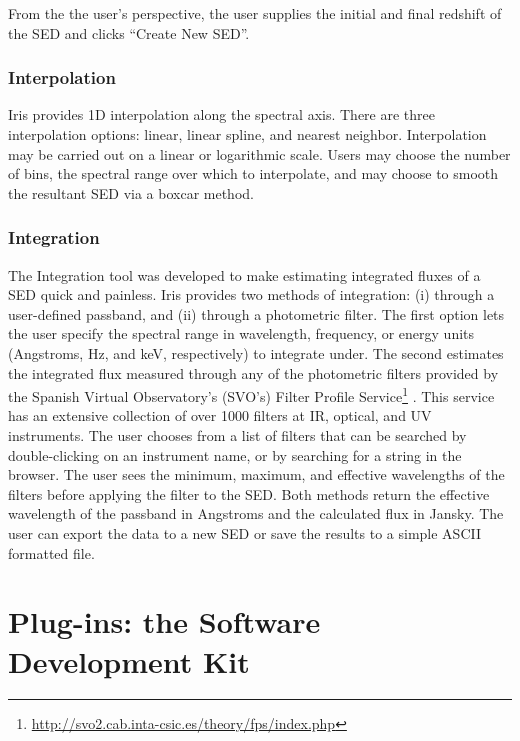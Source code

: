 \documentclass[preprint,authoryear,5p]{elsarticle}
\begin{document}
From the the user's perspective, the user supplies the initial and final redshift of the
SED and clicks ``Create New SED''.

\subsubsection{Interpolation} Iris provides 1D interpolation along the spectral
axis. There are three interpolation options: linear, linear spline, and nearest
neighbor. Interpolation may be carried out on a linear or logarithmic scale.
Users may choose the number of bins, the spectral range over which to
interpolate, and may choose to smooth the resultant SED via a boxcar method.

\subsubsection{Integration} The Integration tool was developed to make
estimating integrated fluxes of a SED quick and painless. Iris provides two
methods of integration: (i) through a user-defined passband, and (ii) through a
photometric filter. The first option lets the user specify the spectral range in
wavelength, frequency, or energy units (Angstroms, Hz, and keV, respectively) to
integrate under. The second estimates the integrated flux measured through any
of the photometric filters provided by the Spanish Virtual Observatory's (SVO's)
Filter Profile
Service\footnote{\url{http://svo2.cab.inta-csic.es/theory/fps/index.php}}
\citep{2013arXiv1312.3249S}. This service has an extensive collection
of over 1000 filters at IR, optical, and UV
instruments. The user chooses from a list of filters
that can be searched by double-clicking on an instrument name, or by searching
for a string in the browser. The user sees the minimum, maximum, and effective
wavelengths of the filters before applying the filter to the SED.
Both methods return the effective wavelength of the passband in Angstroms and
the calculated flux in Jansky. The user can export the data to a new SED or
save the results to a simple ASCII formatted file.

\section{Plug-ins: the Software Development Kit} \label{sec:plugins}
\end{document}
